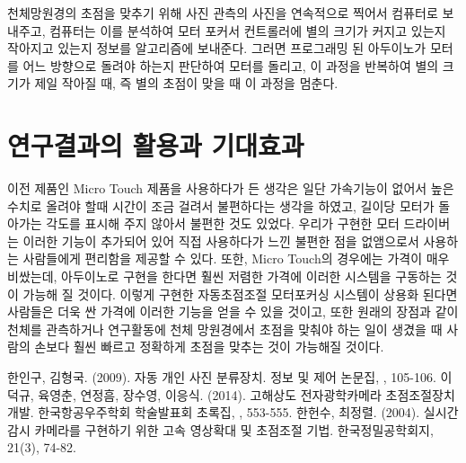 \documentclass{abstract_hutech}
\begin{document}
천체망원경의 초점을 맞추기 위해 사진 관측의 사진을 연속적으로 찍어서 컴퓨터로 보내주고, 컴퓨터는 이를 분석하여 모터 포커서 컨트롤러에 별의 크기가 커지고 있는지 작아지고 있는지 정보를 알고리즘에 보내준다. 그러면 프로그래밍 된 아두이노가 모터를 어느 방향으로 돌려야 하는지 판단하여 모터를 돌리고, 이 과정을 반복하여 별의 크기가 제일 작아질 때, 즉 별의 초점이 맞을 때 이 과정을 멈춘다.

\section{연구결과의 활용과 기대효과}

이전 제품인 Micro Touch 제품을 사용하다가 든 생각은 일단 가속기능이 없어서 높은 수치로 올려야 할때 시간이 조금 걸려서 불편하다는 생각을 하였고, 길이당 모터가 돌아가는 각도를 표시해 주지 않아서 불편한 것도 있었다. 우리가 구현한 모터 드라이버는 이러한 기능이 추가되어 있어 직접 사용하다가 느낀 불편한 점을 없앰으로서 사용하는 사람들에게 편리함을 제공할 수 있다. 또한, Micro Touch의 경우에는 가격이 매우 비쌌는데, 아두이노로 구현을 한다면 훨씬 저렴한 가격에 이러한 시스템을 구동하는 것이 가능해 질 것이다. 이렇게 구현한 자동초점조절 모터포커싱 시스템이 상용화 된다면 사람들은 더욱 싼 가격에 이러한 기능을 얻을 수 있을 것이고, 또한 원래의 장점과 같이 천체를 관측하거나 연구활동에 천체 망원경에서 초점을 맞춰야 하는 일이 생겼을 때 사람의 손보다 훨씬 빠르고 정확하게 초점을 맞추는 것이 가능해질 것이다.

\begin{thebibliography}{99}
 한인구, 김형국. (2009). 자동 개인 사진 분류장치. 정보 및 제어 논문집, , 105-106.
 이덕규, 육영춘, 연정흠, 장수영, 이응식. (2014). 고해상도 전자광학카메라 초점조절장치 개발. 한국항공우주학회 학술발표회 초록집, , 553-555.
 한헌수, 최정렬. (2004). 실시간 감시 카메라를 구현하기 위한 고속 영상확대 및 초점조절 기법. 한국정밀공학회지, 21(3), 74-82.
\end{thebibliography}

\begin{thebibliography}{99}
	
\end{thebibliography}
\end{document}
